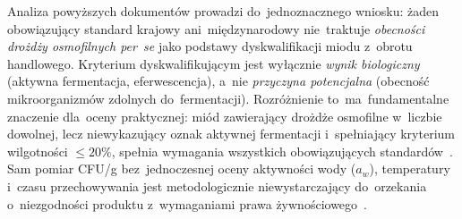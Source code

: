 Analiza powyższych dokumentów prowadzi do~jednoznacznego wniosku:
żaden obowiązujący standard krajowy ani~międzynarodowy nie~traktuje
\emph{obecności drożdży osmofilnych per~se} jako podstawy
dyskwalifikacji miodu z~obrotu handlowego. Kryterium
dyskwalifikującym jest wyłącznie \emph{wynik biologiczny}
(aktywna fermentacja, eferwescencja), a~nie \emph{przyczyna potencjalna}
(obecność mikroorganizmów zdolnych do~fermentacji). Rozróżnienie
to~ma~fundamentalne znaczenie dla~oceny praktycznej: miód zawierający
drożdże osmofilne w~liczbie dowolnej, lecz niewykazujący oznak
aktywnej fermentacji i~spełniający kryterium wilgotności $\leq 20\%$,
spełnia wymagania wszystkich obowiązujących standardów~\cite{codex_stan12,eudir2001110}.
Sam pomiar CFU/g bez~jednoczesnej oceny aktywności wody ($a_w$),
temperatury i~czasu przechowywania jest metodologicznie
niewystarczający do~orzekania o~niezgodności produktu
z~wymaganiami prawa żywnościowego~\cite{tsagkaris2021,schoder2026}.
